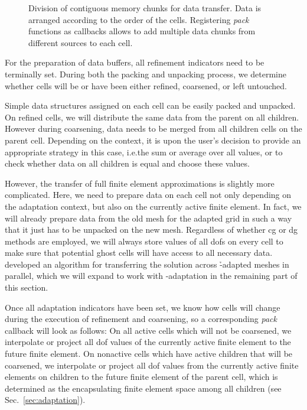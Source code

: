 \begin{figure}
\centering

\caption[Division of contiguous memory chunks for data transfer.]{Division of contiguous memory chunks for data transfer. Data is arranged according to the order of the cells. Registering \textit{pack} functions as callbacks allows to add multiple data chunks from different sources to each cell.}
\label{fig:memory}
\end{figure}

For the preparation of data buffers, all refinement indicators need to be terminally set. During both the packing and unpacking process, we determine whether cells will be or have been either refined, coarsened, or left untouched.

Simple data structures assigned on each cell can be easily packed and unpacked. On refined cells, we will distribute the same data from the parent on all children. However during coarsening, data needs to be merged from all children cells on the parent cell. Depending on the context, it is upon the user's decision to provide an appropriate strategy in this case, i.e.\@ the sum or average over all values, or to check whether data on all children is equal and choose these values.

However, the transfer of full finite element approximations is slightly more complicated. Here, we need to prepare data on each cell not only depending on the adaptation context, but also on the currently active finite element. In fact, we will already prepare data from the old mesh for the adapted grid in such a way that it just has to be unpacked on the new mesh. Regardless of whether \gls{cg} or \gls{dg} methods are employed, we will always store values of all \glspl{dof} on every cell to make sure that potential ghost cells will have access to all necessary data. \textcite{bangerth2012} developed an algorithm for transferring the solution across \h-adapted meshes in parallel, which we will expand to work with \hp-adaptation in the remaining part of this section.

Once all adaptation indicators have been set, we know how cells will change during the execution of refinement and coarsening, so a corresponding \textit{pack} callback will look as follows: On all active cells which will not be coarsened, we interpolate or project all \gls{dof} values of the currently active finite element to the future finite element. On nonactive cells which have active children that will be coarsened, we interpolate or project all \gls{dof} values from the currently active finite elements on children to the future finite element of the parent cell, which is determined as the encapsulating finite element space among all children (see Sec.~\ref{sec:adaptation}).

